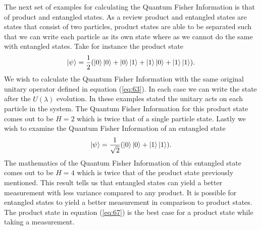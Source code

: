\documentclass[twocolumn]{article}
\begin{document}
The next set of examples for calculating the Quantum Fisher Information is that of product and entangled states. As a review product and entangled states are states that consist of two particles, product states are able to be separated such that we can write each particle as its own state where as we cannot do the same with entangled states. Take for instance the product state 
\begin{equation} \label{eq:67}
\ket{\psi}=\frac{1}{2}(\ket{0}\ket{0}+\ket{0}\ket{1}+\ket{1}\ket{0}+\ket{1}\ket{1}).
\end{equation}
We wish to calculate the Quantum Fisher Information with the same original unitary operator defined in equation (\ref{eq:63}). In each case we can write the state after the $\hat{U}(\lambda)$ evolution. In these examples stated the unitary acts on each particle in the system. The Quantum Fisher Information for this product state comes out to be $H=2$ which is twice that of a single particle state. Lastly we wish to examine the Quantum Fisher Information of an entangled state
\begin{equation} \label{eq:68}
\ket{\psi}=\frac{1}{\sqrt{2}}(\ket{0}\ket{0}+\ket{1}\ket{1}).
\end{equation}
The mathematics of the Quantum Fisher Information of this entangled state comes out to be $H=4$ which is twice that of the product state previously mentioned. This result tells us that entangled states can yield a better measurement with less variance compared to any product. It is possible for entangled states to yield a better measurement in comparison to product states. The product state in equation (\ref{eq:67}) is the best case for a product state while taking a measurement.
\end{document}
